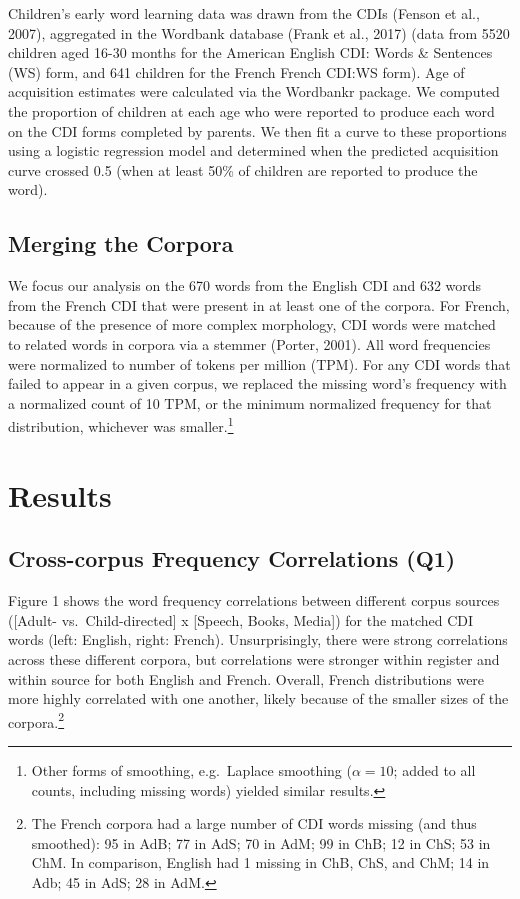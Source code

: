 \documentclass[10pt, letterpaper]{article}
\begin{document}
Children's early word learning data was drawn from the CDIs (Fenson et
al., 2007), aggregated in the Wordbank database (Frank et al., 2017)
(data from 5520 children aged 16-30 months for the American English CDI:
Words \& Sentences (WS) form, and 641 children for the French French
CDI:WS form). Age of acquisition estimates were calculated via the
Wordbankr package. We computed the proportion of children at each age
who were reported to produce each word on the CDI forms completed by
parents. We then fit a curve to these proportions using a logistic
regression model and determined when the predicted acquisition curve
crossed 0.5 (when at least 50\% of children are reported to produce the
word).

\hypertarget{merging-the-corpora}{%
\subsection{Merging the Corpora}\label{merging-the-corpora}}

We focus our analysis on the 670 words from the English CDI and 632
words from the French CDI that were present in at least one of the
corpora. For French, because of the presence of more complex morphology,
CDI words were matched to related words in corpora via a stemmer
(Porter, 2001). All word frequencies were normalized to number of tokens
per million (TPM). For any CDI words that failed to appear in a given
corpus, we replaced the missing word's frequency with a normalized count
of 10 TPM, or the minimum normalized frequency for that distribution,
whichever was smaller.\footnote{Other forms of smoothing, e.g.~Laplace
  smoothing (\(\alpha=10\); added to all counts, including missing
  words) yielded similar results.}

\hypertarget{results}{%
\section{Results}\label{results}}

\hypertarget{cross-corpus-frequency-correlations-q1}{%
\subsection{Cross-corpus Frequency Correlations
(Q1)}\label{cross-corpus-frequency-correlations-q1}}

Figure 1 shows the word frequency correlations between different corpus
sources ({[}Adult- vs.~Child-directed{]} x {[}Speech, Books, Media{]})
for the matched CDI words (left: English, right: French).
Unsurprisingly, there were strong correlations across these different
corpora, but correlations were stronger within register and within
source for both English and French. Overall, French distributions were
more highly correlated with one another, likely because of the smaller
sizes of the corpora.\footnote{The French corpora had a large number of
  CDI words missing (and thus smoothed): 95 in AdB; 77 in AdS; 70 in
  AdM; 99 in ChB; 12 in ChS; 53 in ChM. In comparison, English had 1
  missing in ChB, ChS, and ChM; 14 in Adb; 45 in AdS; 28 in AdM.}
\end{document}
